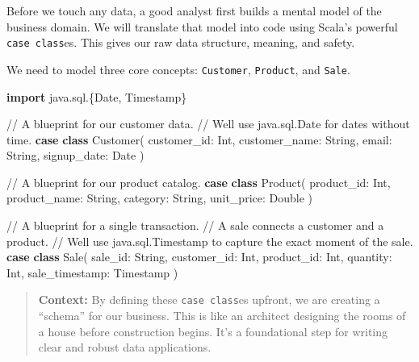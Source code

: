 \documentclass[
  letterpaper,
  DIV=11,
  numbers=noendperiod]{scrreprt}
\newenvironment{Shaded}{\begin{snugshade}}{\end{snugshade}}
\newcommand{\BuiltInTok}[1]{\textcolor[rgb]{0.00,0.23,0.31}{#1}}
\newcommand{\CommentTok}[1]{\textcolor[rgb]{0.37,0.37,0.37}{#1}}
\newcommand{\ControlFlowTok}[1]{\textcolor[rgb]{0.00,0.23,0.31}{\textbf{#1}}}
\newcommand{\ExtensionTok}[1]{\textcolor[rgb]{0.00,0.23,0.31}{#1}}
\newcommand{\FunctionTok}[1]{\textcolor[rgb]{0.28,0.35,0.67}{#1}}
\newcommand{\KeywordTok}[1]{\textcolor[rgb]{0.00,0.23,0.31}{\textbf{#1}}}
\newcommand{\NormalTok}[1]{\textcolor[rgb]{0.00,0.23,0.31}{#1}}
\newcommand{\OperatorTok}[1]{\textcolor[rgb]{0.37,0.37,0.37}{#1}}
\begin{document}
Before we touch any data, a good analyst first builds a mental model of
the business domain. We will translate that model into code using
Scala's powerful \texttt{case\ class}es. This gives our raw data
structure, meaning, and safety.

We need to model three core concepts: \texttt{Customer},
\texttt{Product}, and \texttt{Sale}.

\begin{Shaded}
\begin{Highlighting}[]
\KeywordTok{import}\NormalTok{ java}\OperatorTok{.}\NormalTok{sql}\OperatorTok{.\{}\ExtensionTok{Date}\OperatorTok{,} \ExtensionTok{Timestamp}\OperatorTok{\}}

\CommentTok{// A blueprint for our customer data.}
\CommentTok{// We\textquotesingle{}ll use java.sql.Date for dates without time.}
\ControlFlowTok{case} \KeywordTok{class} \FunctionTok{Customer}\OperatorTok{(}
\NormalTok{  customer\_id}\OperatorTok{:} \BuiltInTok{Int}\OperatorTok{,}
\NormalTok{  customer\_name}\OperatorTok{:} \ExtensionTok{String}\OperatorTok{,}
\NormalTok{  email}\OperatorTok{:} \ExtensionTok{String}\OperatorTok{,}
\NormalTok{  signup\_date}\OperatorTok{:} \ExtensionTok{Date}
\OperatorTok{)}

\CommentTok{// A blueprint for our product catalog.}
\ControlFlowTok{case} \KeywordTok{class} \FunctionTok{Product}\OperatorTok{(}
\NormalTok{  product\_id}\OperatorTok{:} \BuiltInTok{Int}\OperatorTok{,}
\NormalTok{  product\_name}\OperatorTok{:} \ExtensionTok{String}\OperatorTok{,}
\NormalTok{  category}\OperatorTok{:} \ExtensionTok{String}\OperatorTok{,}
\NormalTok{  unit\_price}\OperatorTok{:} \ExtensionTok{Double}
\OperatorTok{)}

\CommentTok{// A blueprint for a single transaction.}
\CommentTok{// A sale connects a customer and a product.}
\CommentTok{// We\textquotesingle{}ll use java.sql.Timestamp to capture the exact moment of the sale.}
\ControlFlowTok{case} \KeywordTok{class} \FunctionTok{Sale}\OperatorTok{(}
\NormalTok{  sale\_id}\OperatorTok{:} \ExtensionTok{String}\OperatorTok{,}
\NormalTok{  customer\_id}\OperatorTok{:} \BuiltInTok{Int}\OperatorTok{,}
\NormalTok{  product\_id}\OperatorTok{:} \BuiltInTok{Int}\OperatorTok{,}
\NormalTok{  quantity}\OperatorTok{:} \BuiltInTok{Int}\OperatorTok{,}
\NormalTok{  sale\_timestamp}\OperatorTok{:} \ExtensionTok{Timestamp}
\OperatorTok{)}
\end{Highlighting}
\end{Shaded}

\begin{quote}
\textbf{Context:} By defining these \texttt{case\ class}es upfront, we
are creating a ``schema'' for our business. This is like an architect
designing the rooms of a house before construction begins. It's a
foundational step for writing clear and robust data applications.
\end{quote}
\end{document}
